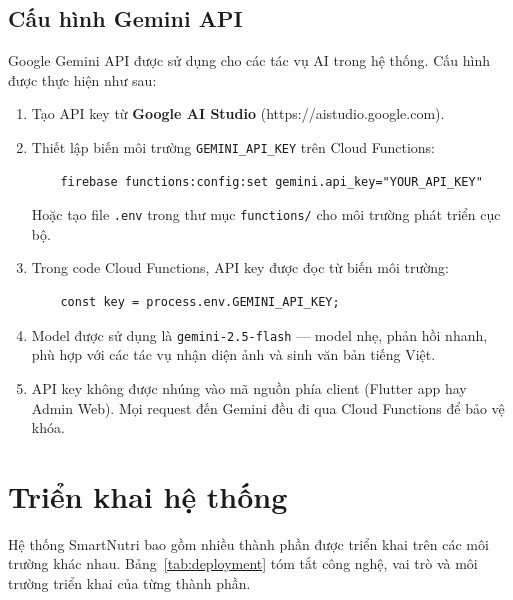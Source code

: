 \subsection{Cấu hình Gemini API}

Google Gemini API được sử dụng cho các tác vụ AI trong hệ thống. Cấu hình được thực hiện như sau:

\begin{enumerate}
    \item Tạo API key từ \textbf{Google AI Studio} (https://aistudio.google.com).
    \item Thiết lập biến môi trường \texttt{GEMINI\_API\_KEY} trên Cloud Functions:
    \begin{verbatim}
    firebase functions:config:set gemini.api_key="YOUR_API_KEY"
    \end{verbatim}
    Hoặc tạo file \texttt{.env} trong thư mục \texttt{functions/} cho môi trường phát triển cục bộ.
    \item Trong code Cloud Functions, API key được đọc từ biến môi trường:
    \begin{verbatim}
    const key = process.env.GEMINI_API_KEY;
    \end{verbatim}
    \item Model được sử dụng là \texttt{gemini-2.5-flash} — model nhẹ, phản hồi nhanh, phù hợp với các tác vụ nhận diện ảnh và sinh văn bản tiếng Việt.
    \item API key không được nhúng vào mã nguồn phía client (Flutter app hay Admin Web). Mọi request đến Gemini đều đi qua Cloud Functions để bảo vệ khóa.
\end{enumerate}

\section{Triển khai hệ thống}

Hệ thống SmartNutri bao gồm nhiều thành phần được triển khai trên các môi trường khác nhau. Bảng~\ref{tab:deployment} tóm tắt công nghệ, vai trò và môi trường triển khai của từng thành phần.

